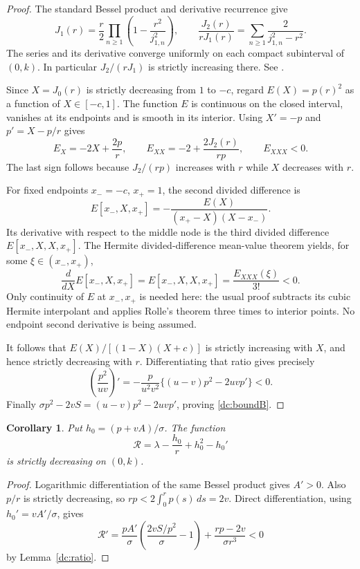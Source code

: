 \documentclass[11pt,letterpaper,reqno]{amsart}
\newtheorem{corollary}[theorem]{Corollary}
\theoremstyle{definition}
\begin{document}
\begin{proof}
The standard Bessel product and derivative recurrence give
\[
 J_1(r)=\frac r2\prod_{n\ge1}
                  \left(1-\frac{r^2}{j_{1,n}^2}\right),\qquad
 \frac{J_2(r)}{rJ_1(r)}
       =\sum_{n\ge1}\frac2{j_{1,n}^2-r^2}.
\]
The series and its derivative converge uniformly on each compact
subinterval of $(0,k)$.  In particular $J_2/(rJ_1)$ is strictly
increasing there.  See \cite[Eqs.~10.21.15 and 10.6.2]{DLMF}.

Since $X=J_0(r)$ is strictly decreasing from $1$ to $-c$, regard
$E(X)=p(r)^2$ as a function of $X\in[-c,1]$.  The function $E$ is
continuous on the closed interval, vanishes at its endpoints and
is smooth in its interior.  Using $X'=-p$ and
$p'=X-p/r$ gives
\[
 E_X=-2X+\frac{2p}r,\qquad
 E_{XX}=-2+\frac{2J_2(r)}{rp},\qquad E_{XXX}<0.
\]
The last sign follows because $J_2/(rp)$ increases with $r$ while
$X$ decreases with $r$.

For fixed endpoints $x_-=-c$, $x_+=1$, the second divided difference is
\[
 E[x_-,X,x_+]=-\frac{E(X)}{(x_+-X)(X-x_-)}.
\]
Its derivative with respect to the middle node is the third divided
difference $E[x_-,X,X,x_+]$.  The Hermite divided-difference mean-value
theorem yields, for some $\xi\in(x_-,x_+)$,
\[
 \frac{d}{dX}E[x_-,X,x_+]=E[x_-,X,X,x_+]
                   =\frac{E_{XXX}(\xi)}{3!}<0.
\]
Only continuity of $E$ at $x_-,x_+$ is needed here: the usual proof
subtracts its cubic Hermite interpolant and applies Rolle's theorem
three times to interior points.  No endpoint second derivative is
being assumed.

It follows that $E(X)/[(1-X)(X+c)]$ is strictly increasing with
$X$, and hence strictly decreasing with $r$.  Differentiating that
ratio gives precisely
\[
 \left(\frac{p^2}{uv}\right)'
 =-\frac{p}{u^2v^2}\{(u-v)p^2-2uvp'\}<0.
\]
Finally $\sigma p^2-2vS=(u-v)p^2-2uvp'$, proving
\eqref{dc:boundB}.
\end{proof}

\begin{corollary}
Put $h_0=(p+vA)/\sigma$. The function
\[
 \mathcal R=\lambda-\frac{h_0}{r}+h_0^2-h_0'
\]
is strictly decreasing on $(0,k)$.
\end{corollary}
\begin{proof}
Logarithmic differentiation of the same Bessel product gives
$A'>0$.  Also $p/r$ is strictly decreasing, so
$rp<2\int_0^rp(s)\,ds=2v$.  Direct differentiation, using
$h_0'=vA'/\sigma$, gives
\[
 \mathcal R'
 =\frac{pA'}{\sigma}\left(\frac{2vS/p^2}{\sigma}-1\right)
                      +\frac{rp-2v}{\sigma r^3}<0
\]
by Lemma~\ref{dc:ratio}.
\end{proof}
\end{document}

